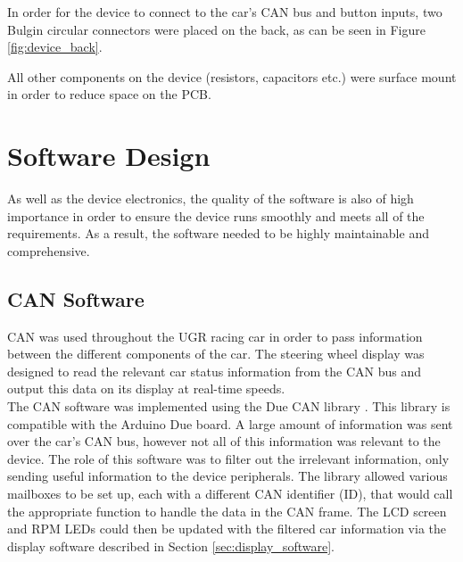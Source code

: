 \documentclass[a4paper,12pt]{article}
\begin{document}
In order for the device to connect to the car's CAN bus and button inputs, two Bulgin circular connectors were placed on the back, as can be seen in Figure \ref{fig:device_back}.



All other components on the device (resistors, capacitors etc.) were surface mount in order to reduce space on the PCB. \\


\newpage
\section{Software Design}
\label{sec:software_design}

As well as the device electronics, the quality of the software is also of high importance in order to ensure the device runs smoothly and meets all of the requirements. As a result, the software needed to be highly maintainable and comprehensive.

\subsection{CAN Software}
\label{sec:CAN_software}

CAN was used throughout the UGR racing car in order to pass information between the different components of the car. The steering wheel display was designed to read the relevant car status information from the CAN bus and output this data on its display at real-time speeds. \\

The CAN software was implemented using the Due CAN library \cite{due_can}. This library is compatible with the Arduino Due board. A large amount of information was sent over the car's CAN bus, however not all of this information was relevant to the device. The role of this software was to filter out the irrelevant information, only sending useful information to the device peripherals. The library allowed various mailboxes to be set up, each with a different CAN identifier (ID), that would call the appropriate function to handle the data in the CAN frame. The LCD screen and RPM LEDs could then be updated with the filtered car information via the display software described in Section \ref{sec:display_software}. \\
\end{document}
